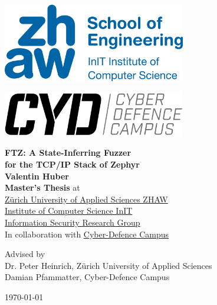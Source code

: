 \documentclass[twocolumn]{article}
\newcommand{\proj}{FTZ\xspace}
\begin{document}
\begin{titlepage}
  \large
  \begin{minipage}[c]{0.5\textwidth}
    \includegraphics[width=0.6\textwidth]{assets/zhaw-init-logo.png}
  \end{minipage}%
  \begin{minipage}[c]{0.5\textwidth}
    \raggedleft
    \includegraphics[width=0.6\textwidth]{assets/cyd-logo.png}
  \end{minipage}

  \begin{center}
    {\Huge\bfseries \proj : A State-Inferring Fuzzer\\[10pt]for the TCP/IP Stack of Zephyr}\\
    {\Large\bfseries Valentin Huber}\\
    {\large{\bfseries Master's Thesis} at}\\[1ex]
    \href{https://www.zhaw.ch/en/engineering/institutes-centres/init/information-security}{
      Zürich University of Applied Sciences ZHAW\\
      Institute of Computer Science InIT\\
      Information Security Research Group
    }\\[2ex]
    In collaboration with \href{https://www.cydcampus.admin.ch/}{Cyber-Defence Campus}\\

    Advised by\\
    Dr. Peter Heinrich, Zürich University of Applied Sciences\\
    Damian Pfammatter, Cyber-Defence Campus\\


    \today

  \end{center}
\end{titlepage}
\end{document}
